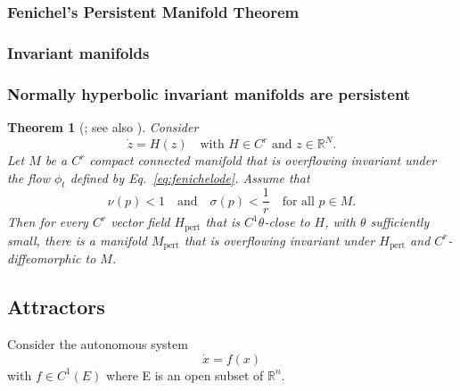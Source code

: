 \documentclass{article}
\newtheorem{theorem}{Theorem}
\theoremstyle{definition} \newtheorem{definition}{Definition}
\theoremstyle{remark} \newtheorem{remark}{Remark}
\newcommand{\reals}{\mathbb{R}}
\newcounter{ct}
\begin{document}
\subsubsection{Fenichel's Persistent Manifold Theorem}\label{sec:fenichel}

\subsubsection{Invariant manifolds}\label{sec:invman}
\citep{roberts1989invariant,
kalitin2021attractors}

\citep{hirsch1970invariant}
\citep{wiggins1994nhim}
\citep{jones1995gspt}
\citep{kuehn2015multipletimescale}


\subsubsection{Normally hyperbolic invariant manifolds are persistent}
\begin{theorem}[\citep{fenichel1971persistence}; see also \citep{kuehn2015multipletimescale}]
 Consider
\begin{equation}\label{eq:fenichelode}
\dot{z} = H(z) \quad \text{with } H \in C^r \text{ and } z \in \mathbb{R}^N. 
\end{equation}
Let \( M \) be a \( C^r \) compact connected manifold that is overflowing invariant under the flow \( \phi_t \) defined by Eq.~\ref{eq:fenichelode}. Assume that
\begin{equation}
\nu(p) < 1 \quad \text{and} \quad \sigma(p) < \frac{1}{r} \quad \text{for all } p \in M. 
\end{equation}
Then for every \( C^r \) vector field \( H_{\text{pert}} \) that is \( C^1 \theta \)-close to \( H \), with \( \theta \) sufficiently small, there is a manifold \( M_{\text{pert}} \) that is overflowing invariant under \( H_{\text{pert}} \) and \( C^r \)-diffeomorphic to \( M \).
\end{theorem}




\subsection{Attractors}\label{sec:attractors}
Consider the autonomous system
\begin{equation}\label{eq:attractorode}
\dot x = f(x)
\end{equation}
with \(f \in C^1(E)\) where E is an open subset of \(\reals^n\). 
\end{document}
